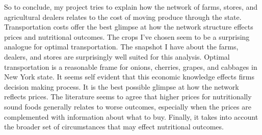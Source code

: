 \documentclass{report}
\begin{document}
So to conclude, my project tries to explain how the network of farms, stores, and agricultural dealers relates to the cost of moving produce through the state. Transportation costs offer the best glimpse at how the network structure effects prices and nutritional outcomes.  The crops I've chosen seem to be a surprising analogue for optimal transportation. The snapshot I have about the farms, dealers, and stores are surprisingly well suited for this analysis.  Optimal transportation is a reasonable frame for onions, cherries, grapes, and cabbages in New York state. It seems self evident that this economic knowledge effects firms decision making process. It is the best possible glimpse at how the network reflects prices. The literature seems to agree that higher prices for nutritionally sound foods generally relates to worse outcomes, especially when the prices are complemented with information about what to buy. Finally, it takes into account the broader set of circumstances that may effect nutritional outcomes. 

\pagebreak
\end{document}
